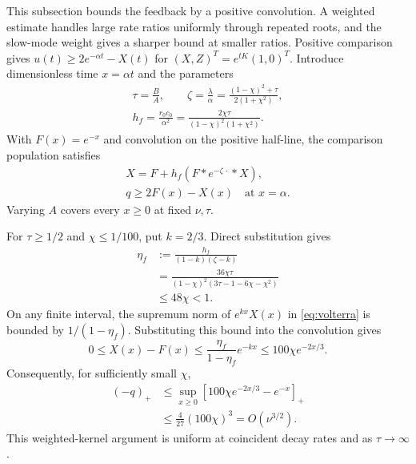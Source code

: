 \documentclass[aps,pra,reprint,amsmath,amssymb,nofootinbib,floatfix,longbibliography]{revtex4-2}
\theoremstyle{aps}
\begin{document}
This subsection bounds the feedback by a positive convolution. A weighted estimate handles large rate ratios uniformly through repeated roots, and the slow-mode weight gives a sharper bound at smaller ratios. Positive comparison gives $u(t)\ge2e^{-\alpha t}-X(t)$ for $(X,Z)^T=e^{tK}(1,0)^T$. Introduce dimensionless time $x=\alpha t$ and the parameters
\begin{equation}\label{eq:diag-parameters}
 \begin{gathered}
 \tau=\frac BA,\qquad
 \zeta=\frac\lambda\alpha
 =\frac{(1-\chi)^2+\tau}{2(1+\chi^2)},\\
 h_f=\frac{r_0c_0}{\alpha^2}
 =\frac{2\chi\tau}{(1-\chi)^2(1+\chi^2)}.
 \end{gathered}
\end{equation}
With $F(x)=e^{-x}$ and convolution on the positive half-line, the comparison population satisfies
\begin{equation}\label{eq:volterra}
 \begin{gathered}
 X=F+h_f(F*e^{-\zeta\,\cdot}*X),\\
 q\ge2F(x)-X(x)\quad\text{at }x=\alpha.
 \end{gathered}
\end{equation}
Varying $A$ covers every $x\ge0$ at fixed $\nu,\tau$.

For $\tau\ge1/2$ and $\chi\le1/100$, put $k=2/3$. Direct substitution gives
\begin{equation}\label{eq:weighted-feedback}
 \begin{aligned}
 \eta_f&:=\frac{h_f}{(1-k)(\zeta-k)}
 \\&=\frac{36\chi\tau}
 {(1-\chi)^2(3\tau-1-6\chi-\chi^2)}
 \\&\le48\chi<1.
 \end{aligned}
\end{equation}
On any finite interval, the supremum norm of $e^{kx}X(x)$ in \eqref{eq:volterra} is bounded by $1/(1-\eta_f)$. Substituting this bound into the convolution gives
\begin{equation}\label{eq:diag-large-correction}
 0\le X(x)-F(x)\le\frac{\eta_f}{1-\eta_f}e^{-kx}
 \le100\chi e^{-2x/3}.
\end{equation}
Consequently, for sufficiently small $\chi$,
\begin{equation}\label{eq:diag-large}
 \begin{aligned}
 (-q)_+&\le\sup_{x\ge0}[100\chi e^{-2x/3}-e^{-x}]_+
 \\&\le\frac4{27}(100\chi)^3=O(\nu^{3/2}).
 \end{aligned}
\end{equation}
This weighted-kernel argument is uniform at coincident decay rates and as $\tau\to\infty$.
\end{document}
